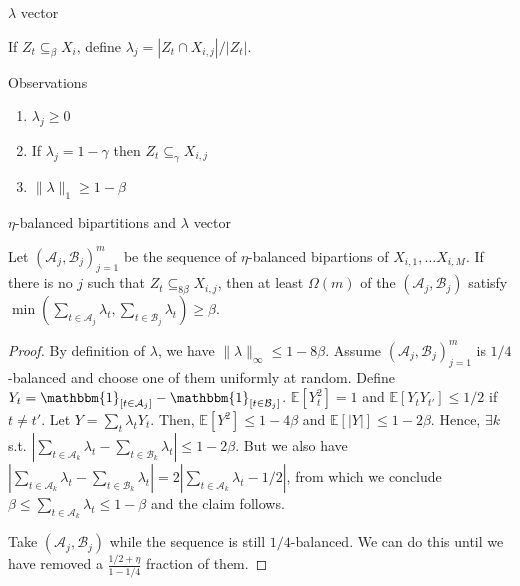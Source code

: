 \documentclass{beamer}
\newcommand{\1}{\mathbbm{1}}
\newcommand{\A}{\mathcal{A}}
\newcommand{\B}{\mathcal{B}}
\newcommand{\indicator}[1]{\1_{[#1]}}
\newcommand{\Exp}[1]{\mathbb{E}\left [#1 \right ]}
\begin{document}
\begin{frame}{$\lambda$ vector}
  \begin{definition}
    If $Z_t \subseteq_\beta X_i$, define $\lambda_j = |Z_t \cap X_{i, j}| / |Z_t|$.
  \end{definition}

  \pause

  \begin{block}{Observations}
    \begin{enumerate}
      \pause
      \item $\lambda_j \ge 0$
            \pause
      \item If $\lambda_j = 1 - \gamma$ then $Z_t \subseteq_\gamma X_{i, j}$
            \pause
      \item $\lVert \lambda \rVert_1 \ge 1 - \beta$
    \end{enumerate}
  \end{block}
\end{frame}

\begin{frame}{$\eta$-balanced bipartitions and $\lambda$ vector}
  \begin{lemma}
    Let $(\A_j, \B_j)_{j = 1}^m$ be the sequence of $\eta$-balanced bipartions of $X_{i,
          1}, \dots X_{i, M}$. If there is no $j$ such that $Z_t \subseteq_{8 \beta} X_{i, j}$,
    then at least $\Omega(m)$ of the $(\A_j, \B_j)$ satisfy $\min(\sum_{t \in \A_j}
      \lambda_t, \sum_{t \in \B_j} \lambda_t) \ge \beta$.
  \end{lemma}

  \pause

  \begin{proof}
    By definition of $\lambda$, we have $\lVert \lambda \rVert_\infty \le 1 - 8\beta$.
    \pause
    Assume $(\A_j, \B_j)_{j = 1}^m$ is $1/4$-balanced and choose one of them uniformly at
    random.
    \pause
    Define $Y_t = \indicator{t \in \A_j} - \indicator{t \in \B_j}$.
    \pause
    $\Exp{Y_t^2} = 1$ and $\Exp{Y_t Y_{t'}} \le 1/2$ if $t \ne t'$.
    \pause
    Let $Y = \sum_t \lambda_t Y_t$.
    \pause
    Then, $\Exp{Y^2} \le 1 - 4 \beta$ and $\Exp{|Y|} \le 1 - 2 \beta$.
    \pause
    Hence, $\exists k$ s.t. $|\sum_{t \in \A_k} \lambda_t - \sum_{t \in \B_k} \lambda_t|
    \le 1 - 2 \beta$.
    \pause
    But we also have $|\sum_{t \in \A_k} \lambda_t - \sum_{t \in \B_k} \lambda_t| =
    2|\sum_{t \in \A_k} \lambda_t - 1/2|$,
    \pause
    from which we conclude $\beta \le \sum_{t \in \A_k} \lambda_t \le 1 - \beta$ and the
    claim follows.

    \pause
    Take $(\A_j, \B_j)$ while the sequence is still $1/4$-balanced. We can do this until
    we have removed a $\frac{1/2 + \eta}{1 - 1/4}$ fraction of them.
  \end{proof}
\end{frame}
\end{document}
